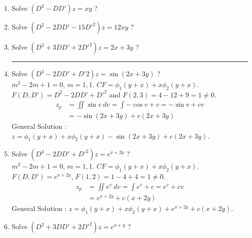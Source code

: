 \begin{enumerate}
\item Solve $(D^2 - DD')z = xy$ ?\\
\item Solve $(D^2 - 2DD' - 15D'^2)z = 12xy$ ?\\
\item Solve $(D^2 + 3DD' + 2D'^2)z = 2x + 3y$ ?\\
	\hrule
\item Solve $(D^2 - 2DD' +D'2)z = \sin (2x+3y)$ ?\\
	$m^2 - 2m + 1 = 0$, $m = 1,1$.
	$CF = \phi_1(y+x) + x\phi_2(y+x)$.\\
	$F(D,D') = D^2 - 2DD' + D'^2$ and $F(2,3) = 4 - 12 + 9 = 1 \ne 0$.
	\begin{align*}
		z_p &= \iint \sin v\ dv = \int -\cos v + c = -\sin v + cv \\
		&= -\sin(2x + 3y) + c(2x+3y) 
	\end{align*}
	General Solution :
		$z = \phi_1(y+x) + x\phi_2(y+x) - \sin(2x+3y) + c(2x+3y)$.
	\item Solve $(D^2 - 2DD' + D'^2)z = e^{x+2y}$ ?\\
	$m^2 - 2m + 1 = 0$, $m = 1,1$.
	$CF = \phi_1(y+x) + x\phi_2(y+x)$.\\
	$F(D,D') = e^{x+2y}$, $F(1,2) = 1-4+4 = 1 \ne 0$.
	\begin{align*}
		z_p &= \iint e^v\ dv = \int e^v + c = e^v + cv \\
		& = e^{x+2y} + c(x+2y)
	\end{align*}
	General Solution :
	$z = \phi_1(y+x) + x\phi_2(y+x) + e^{x+2y} + c(x+2y)$.
\item Solve $(D^2 + 3DD' + 2D'^2)z = e^{x+y}$ ?\\
\end{enumerate}	


